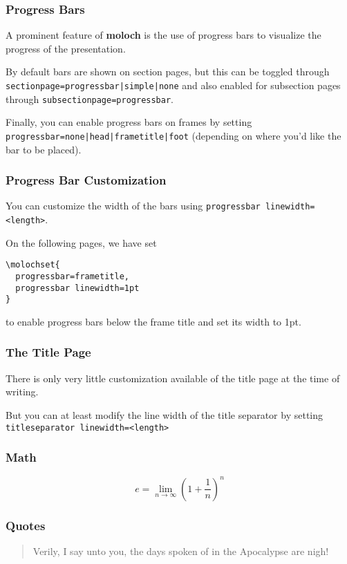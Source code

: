 \documentclass[10pt]{beamer}
\newcommand{\themename}{\textbf{moloch}\xspace}
\begin{document}
\begin{frame}[c]
  \frametitle{Progress Bars}

  A prominent feature of \themename is the use of progress bars to
  visualize the progress of the presentation. \medskip

  By default bars are shown on section pages, but this can be toggled
  through \texttt{sectionpage=progressbar|simple|none} and also enabled for 
  subsection pages through \texttt{subsectionpage=progressbar}.\medskip

  
  Finally, you can enable progress bars on frames by setting 
  \texttt{progressbar=none|head|frametitle|foot} (depending on where
  you'd like the bar to be placed).\medskip
\end{frame}

\begin{frame}[c,fragile]
  \frametitle{Progress Bar Customization}
  You can customize the width of the bars using
  \texttt{progressbar linewidth=<length>}.\medskip

  On the following pages, we have set
\begin{verbatim}\molochset{
  progressbar=frametitle,
  progressbar linewidth=1pt
}
\end{verbatim}
  to enable progress bars below the frame title and set its width to 1pt.
\end{frame}


\begin{frame}[c,fragile]
  \frametitle{The Title Page}

  There is only very little customization available of the title page at the
  time of writing.\medskip

  But you can at least modify the line width of the title separator
  by setting \texttt{titleseparator linewidth=<length>}
\end{frame}

\begin{frame}
\frametitle{Math}
  \begin{equation*}
    e = \lim_{n\to \infty} \left(1 + \frac{1}{n}\right)^n
  \end{equation*}
\end{frame}

\begin{frame}
\frametitle{Quotes}
  \begin{quote}
    Verily, I say unto you, the days spoken of in the Apocalypse are nigh!
  \end{quote}
\end{frame}
\end{document}
